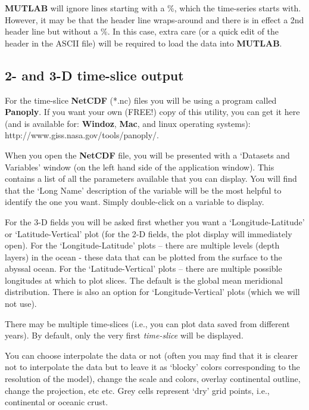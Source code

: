 \textbf{MUTLAB} will ignore lines starting with a \textsf{\footnotesize \%}, which the time-series starts with. However, it may be that the header line wraps-around and there is in effect a 2nd header line but without a \textsf{\footnotesize \%}. In this case, extra care (or a quick edit of the header in the ASCII file) will be required to load the data into \textbf{MUTLAB}.


\subsection{2- and 3-D time-slice output}

For the time-slice \textbf{NetCDF} (*.nc) files you will be using a program called \textbf{Panoply}. If you want your own (FREE!) copy of this utility, you can get it here (and is available for: \textbf{Windoz}, \textbf{Mac}, and linux operating systems): http://www.giss.nasa.gov/tools/panoply/.

\noindent When you open the \textbf{NetCDF} file, you will be presented with a ‘\textsf{\footnotesize Datasets and Variables}’ window (on the left hand side of the application window). This contains a list of all the parameters available that you can display. You will find that the ‘\textsf{\footnotesize Long Name}’ description of the variable will be the most helpful to identify the one you want. Simply double-click on a variable to display. 

For the 3-D fields you will be asked first whether you want a ‘\textsf{\footnotesize \footnotesize Longitude-Latitude}’ or ‘\textsf{\footnotesize Latitude-Vertical}’ plot (for the 2-D fields, the plot display will immediately open).
For the ‘\textsf{\footnotesize Longitude-Latitude}’ plots – there are multiple levels (depth layers) in the ocean - these data that can be plotted from the surface to the abyssal ocean. For the ‘\textsf{\footnotesize Latitude-Vertical}' plots – there are multiple possible longitudes at which to plot slices. The default is the global mean meridional distribution. There is also an option for ‘\textsf{\footnotesize Longitude-Vertical}' plots (which we will not use).

There may be multiple time-slices (i.e., you can plot data saved from different years). By default, only the very first \textit{time-slice} will be displayed.

You can choose interpolate the data or not (often you may find that it is clearer not to interpolate the data but to leave it as ‘blocky’ colors corresponding to the resolution of the model), change the scale and colors, overlay continental outline, change the projection, etc etc. Grey cells represent ‘dry’ grid points, i.e., continental or oceanic crust.

